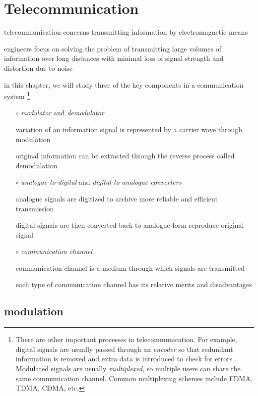 \section{Telecommunication}


telecommunication concerns transmitting information by electromagnetic means

engineers focus on solving the problem of transmitting large volumes of information over long distances with minimal loss of signal strength and distortion due to noise

in this chapter, we will study three of the key components in a communication system
\footnote{There are other important processes in telecommunication. For example, digital signals are usually passed through an \emph{encoder} so that redundant information is removed and extra data is introduced to check for errors . Modulated signals are usually \emph{multiplexed}, so multiple users can share the same communication channel. Common multiplexing schemes include FDMA, TDMA, CDMA, etc.}

\begin{itemize}[leftmargin=\parindent]
	\item[$\circ$] \emph{modulator} and \emph{demodulator}
	
	variation of an information signal is represented by a carrier wave through modulation
	
	original information can be extracted through the reverse process called demodulation
	
	\item[$\circ$] \emph{analogue-to-digital} and \emph{digital-to-analogue converters}
	
	analogue signals are digitized to archive more reliable and efficient transmission
	
	digital signals are then converted back to analogue form reproduce original signal
	
	\item[$\circ$] \emph{communication channel}
	
	communication channel is a medium through which signals are transmitted
	
	each type of communication channel has its relative merits and disadvantages
\end{itemize}



\subsection{modulation}

